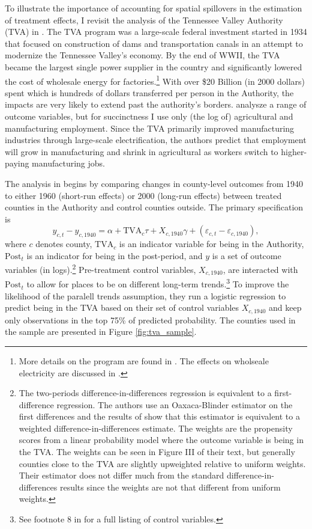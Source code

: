 \documentclass[11pt]{article}
\begin{document}
To illustrate the importance of accounting for spatial spillovers in the estimation of treatment effects, I revisit the analysis of the Tennessee Valley Authority (TVA) in \citet{Kline_Moretti_2014}. The TVA program was a large-scale federal investment started in 1934 that focused on construction of dams and transportation canals in an attempt to modernize the Tennessee Valley's economy. By the end of WWII, the TVA became the largest single power supplier in the country and significantly lowered the cost of wholesale energy for factories.\footnote{More details on the program are found in \citet{Kline_Moretti_2014}. The effects on wholseale electricity are discussed in \citet{Kitchens_2014}.} With over \$20 Billion (in 2000 dollars) spent which is hundreds of dollars transferred per person in the Authority, the impacts are very likely to extend past the authority's borders. \citet{Kline_Moretti_2014} analysze a range of outcome variables, but for succinctness I use only (the log of) agricultural and manufacturing employment. Since the TVA primarily improved manufacturing industries through large-scale electrification, the authors predict that employment will grow in manufacturing and shrink in agricultural as workers switch to higher-paying manufacturing jobs. 

The analysis in \citet{Kline_Moretti_2014} begins by comparing changes in county-level outcomes from 1940 to either 1960 (short-run effects) or 2000 (long-run effects) between treated counties in the Authority and control counties outside. The primary specification is
\begin{equation}\label{eq:tva}
    y_{c, t} - y_{c, 1940} = \alpha + \text{TVA}_c \tau + X_{c, 1940} \gamma + (\varepsilon_{c, t} - \varepsilon_{c, 1940}),
\end{equation}
where $c$ denotes county, $\text{TVA}_c$ is an indicator variable for being in the Authority, $\text{Post}_t$ is an indicator for being in the post-period, and $y$ is a set of outcome variables (in logs).\footnote{The two-periods difference-in-differences regression is equivalent to a first-difference regression. The authors use an Oaxaca-Blinder estimator on the first differences and the results of \citet{Kline_2011} show that this estimator is equivalent to a weighted difference-in-differences estimate. The weights are the propensity scores from a linear probability model where the outcome variable is being in the TVA. The weights can be seen in Figure III of their text, but generally counties close to the TVA are slightly upweighted relative to uniform weights. Their estimator does not differ much from the standard difference-in-differences results since the weights are not that different from uniform weights.} Pre-treatment control variables, $X_{c,1940}$, are interacted with $\text{Post}_t$ to allow for places to be on different long-term trends.\footnote{See footnote 8 in \citet{Kline_Moretti_2014} for a full listing of control variables.} To improve the likelihood of the paralell trends assumption, they run a logistic regression to predict being in the TVA based on their set of control variables $X_{c,1940}$ and keep only observations in the top 75\% of predicted probability. The counties used in the sample are presented in Figure \ref{fig:tva_sample}.
\end{document}
